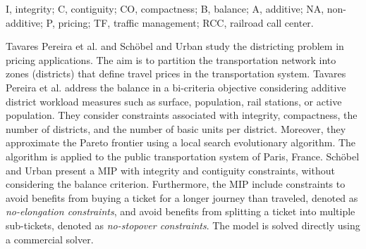 \documentclass[preprint,11pt]{elsarticle}
\begin{document}
\begin{table}[h]
\centering
\caption{Selected studies on districting in transportation networks}
\label{table:districting}

\footnotesize{I, integrity; C, contiguity; CO, compactness; B, balance; A, additive; NA, non-additive; P, pricing; TF, traffic management; RCC, railroad call center.}
\end{table}




Tavares Pereira et al. \citep{Tavares2007} and Schöbel and Urban \citep{Schöbel2025} study the districting problem in pricing applications. The aim is to partition the transportation network into zones (districts) that define travel prices in the transportation system. 
Tavares Pereira et al. \citep{Tavares2007} address the balance in a bi-criteria objective considering additive district workload measures such as surface, population, rail stations, or active population.
They consider constraints associated with integrity, compactness, the number of districts, and the number of basic units per district.
Moreover, they approximate the Pareto frontier using a local search evolutionary algorithm.
The algorithm is applied to the public transportation system of Paris, France. 
Schöbel and Urban \citep{Schöbel2025} present a MIP with integrity and contiguity constraints, without considering the balance criterion. 
Furthermore, the MIP include constraints to avoid benefits from buying a ticket for a longer journey than traveled, denoted as \textit{no-elongation constraints}, and avoid benefits from splitting a ticket into multiple sub-tickets, denoted as \textit{no-stopover constraints}. 
The model is solved directly using a commercial solver.
\end{document}
